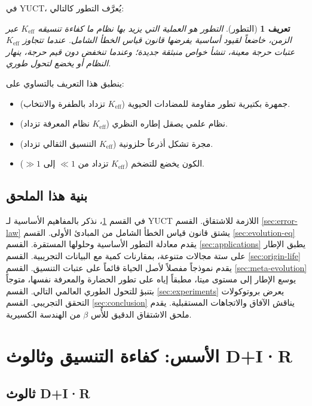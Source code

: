 \documentclass[11pt,a4paper]{article}
\newcommand{\Keff}{K_{\mathrm{eff}}}
\newtheorem{definition}[theorem]{تعريف}
\begin{document}
	في YUCT، يُعرَّف التطور كالتالي:
	
	\begin{definition}[التطور]
		التطور هو العملية التي يزيد بها نظام ما كفاءة تنسيقه \(\Keff\) عبر الزمن، خاضعاً لقيود أساسية يفرضها قانون قياس الخطأ الشامل. عندما تتجاوز \(\Keff\) عتبات حرجة معينة، تنشأ خواص منبثقة جديدة؛ وعندما تنخفض دون قيم حرجة، ينهار النظام أو يخضع لتحول طوري.
	\end{definition}
	
	ينطبق هذا التعريف بالتساوي على:
	
	\begin{itemize}
		\item جمهرة بكتيرية تطور مقاومة للمضادات الحيوية (\(\Keff\) تزداد بالطفرة والانتخاب).
		\item نظام علمي يصقل إطاره النظري (\(\Keff\) نظام المعرفة تزداد).
		\item مجرة تشكل أذرعاً حلزونية (\(\Keff\) التنسيق الثقالي تزداد).
		\item الكون يخضع للتضخم (\(\Keff\) تزداد من \(\ll 1\) إلى \(\gg 1\)).
	\end{itemize}
	
	\subsection{بنية هذا الملحق}
	
	في القسم \ref{sec:foundations}، نذكر بالمفاهيم الأساسية لـ YUCT اللازمة للاشتقاق. القسم \ref{sec:error-law} يشتق قانون قياس الخطأ الشامل من المبادئ الأولى. القسم \ref{sec:evolution-eq} يقدم معادلة التطور الأساسية وحلولها المستقرة. القسم \ref{sec:applications} يطبق الإطار على ستة مجالات متنوعة، بمقارنات كمية مع البيانات التجريبية. القسم \ref{sec:origin-life} يقدم نموذجاً مفصلاً لأصل الحياة قائماً على عتبات التنسيق. القسم \ref{sec:meta-evolution} يوسع الإطار إلى مستوى ميتا، مطبقاً إياه على تطور الحضارة والمعرفة نفسها، متوجاً بتنبؤ للتحول الطوري العالمي التالي. القسم \ref{sec:experiments} يعرض بروتوكولات التحقق التجريبي. القسم \ref{sec:conclusion} يناقش الآفاق والاتجاهات المستقبلية. يقدم ملحق الاشتقاق الدقيق للأُس \(\beta\) من الهندسة الكسيرية.
	
	\section{الأسس: كفاءة التنسيق وثالوث D+I·R}
	\label{sec:foundations}
	
	\subsection{ثالوث D+I·R}
	
\end{document}
